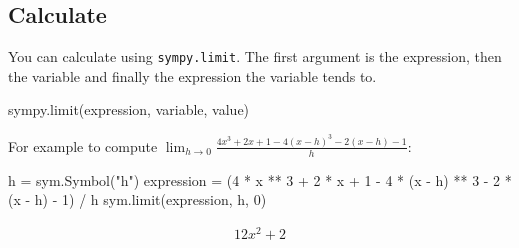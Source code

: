 \subsection{Calculate }

You can calculate  using \texttt{sympy.limit}. The first argument is the
expression, then the variable and finally the expression the variable tends to.


\begin{api}
sympy.limit(expression, variable, value)
\end{api}



For example to compute \(\lim_{h \to 0} \frac{4 x ^ 3 + 2 x + 1 - 4(x - h)^3 - 2(x - h) - 1}{h}\):




\begin{pyin}
h = sym.Symbol("h")
expression = (4 * x ** 3 + 2 * x + 1 - 4 * (x - h) ** 3 - 2 * (x - h) - 1) / h
sym.limit(expression, h, 0)
\end{pyin}




\begin{equation*}
\begin{split}\displaystyle 12 x^{2} + 2\end{split}
\end{equation*}






